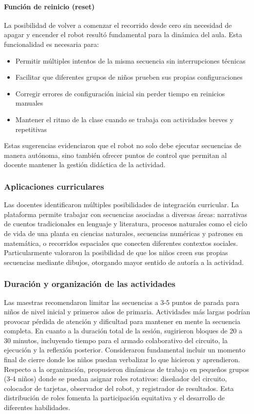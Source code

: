 \documentclass{prgrado}
\begin{document}
\paragraph{Función de reinicio (reset)} La posibilidad de volver a comenzar el recorrido desde cero sin necesidad de apagar y encender el robot resultó fundamental para la dinámica del aula. Esta funcionalidad es necesaria para:
\begin{itemize}
\item Permitir múltiples intentos de la misma secuencia sin interrupciones técnicas
\item Facilitar que diferentes grupos de niños prueben sus propias configuraciones
\item Corregir errores de configuración inicial sin perder tiempo en reinicios manuales
\item Mantener el ritmo de la clase cuando se trabaja con actividades breves y repetitivas
\end{itemize}
Estas sugerencias evidenciaron que el robot no solo debe ejecutar secuencias de manera autónoma, sino también ofrecer puntos de control que permitan al docente mantener la gestión didáctica de la actividad.
\subsubsection{Aplicaciones curriculares}
Las docentes identificaron múltiples posibilidades de integración curricular. La plataforma permite trabajar con secuencias asociadas a diversas áreas: narrativas de cuentos tradicionales en lenguaje y literatura, procesos naturales como el ciclo de vida de una planta en ciencias naturales, secuencias numéricas y patrones en matemática, o recorridos espaciales que conecten diferentes contextos sociales. Particularmente valoraron la posibilidad de que los niños creen sus propias secuencias mediante dibujos, otorgando mayor sentido de autoría a la actividad.

\subsubsection{Duración y organización de las actividades}
Las maestras recomendaron limitar las secuencias a 3-5 puntos de parada para niños de nivel inicial y primeros años de primaria. Actividades más largas podrían provocar pérdida de atención y dificultad para mantener en mente la secuencia completa.
En cuanto a la duración total de la sesión, sugirieron bloques de 20 a 30 minutos, incluyendo tiempo para el armado colaborativo del circuito, la ejecución y la reflexión posterior. Consideraron fundamental incluir un momento final de cierre donde los niños puedan verbalizar lo que hicieron y aprendieron.
Respecto a la organización, propusieron dinámicas de trabajo en pequeños grupos (3-4 niños) donde se puedan asignar roles rotativos: diseñador del circuito, colocador de tarjetas, observador del robot, y registrador de resultados. Esta distribución de roles fomenta la participación equitativa y el desarrollo de diferentes habilidades.
\end{document}
